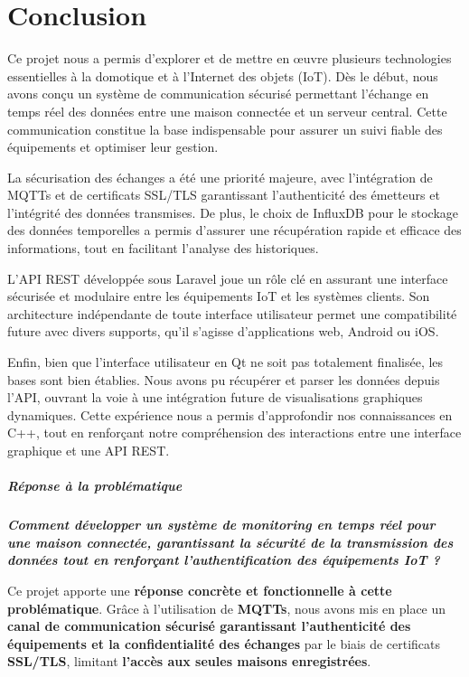 \documentclass[10pt, a4paper]{report}
\begin{document}
	
	\chapter{Conclusion}
	Ce projet nous a permis d’explorer et de mettre en œuvre plusieurs technologies essentielles à la domotique et à l’Internet des objets (IoT). Dès le début, nous avons conçu un système de communication sécurisé permettant l’échange en temps réel des données entre une maison connectée et un serveur central. Cette communication constitue la base indispensable pour assurer un suivi fiable des équipements et optimiser leur gestion.
	
	La sécurisation des échanges a été une priorité majeure, avec l’intégration de MQTTs et de certificats SSL/TLS garantissant l’authenticité des émetteurs et l’intégrité des données transmises. De plus, le choix de InfluxDB pour le stockage des données temporelles a permis d’assurer une récupération rapide et efficace des informations, tout en facilitant l’analyse des historiques.
	
	L’API REST développée sous Laravel joue un rôle clé en assurant une interface sécurisée et modulaire entre les équipements IoT et les systèmes clients. Son architecture indépendante de toute interface utilisateur permet une compatibilité future avec divers supports, qu’il s’agisse d’applications web, Android ou iOS.
	
	Enfin, bien que l’interface utilisateur en Qt ne soit pas totalement finalisée, les bases sont bien établies. Nous avons pu récupérer et parser les données depuis l’API, ouvrant la voie à une intégration future de visualisations graphiques dynamiques. Cette expérience nous a permis d’approfondir nos connaissances en C++, tout en renforçant notre compréhension des interactions entre une interface graphique et une API REST.\\
	
	\paragraph{Réponse à la problématique\\}
	\textbf{\textit{Comment développer un système de monitoring en temps réel pour une maison connectée, garantissant la sécurité de la transmission des données tout en renforçant l'authentification des équipements IoT ?}}\vspace{1cm}
	
	Ce projet apporte une \textbf{réponse concrète et fonctionnelle à cette problématique}. Grâce à l’utilisation de \textbf{MQTTs}, nous avons mis en place un \textbf{canal de communication sécurisé garantissant l’authenticité des équipements et la confidentialité des échanges} par le biais de certificats \textbf{SSL/TLS}, limitant \textbf{l’accès aux seules maisons enregistrées}.
	
\end{document}
